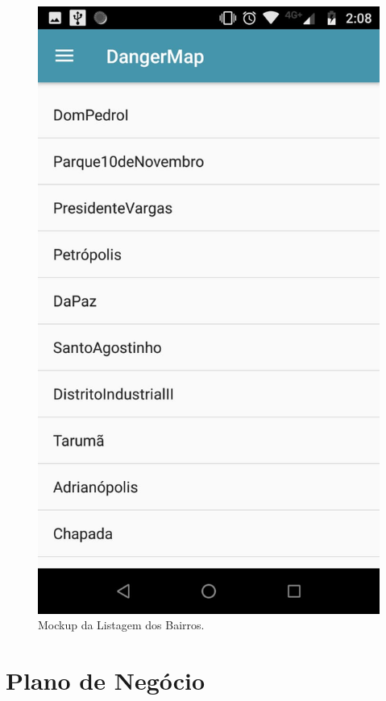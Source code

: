\documentclass[
	12pt,				%
	openright,			%
	twoside,			%
	a4paper,			%
	english,			%
	french,				%
	spanish,			%
	brazil,				%
	]{abntex2}
\begin{document}
\begin{figure}[h]
	\caption{\label{tela_principal}Mockup da Listagem dos Bairros.}
	\begin{center}
		\includegraphics[scale=0.2]{figuras/tela-listabairros.jpeg}
	\end{center}
\end{figure}

\part{Plano de Negócio}
\end{document}
